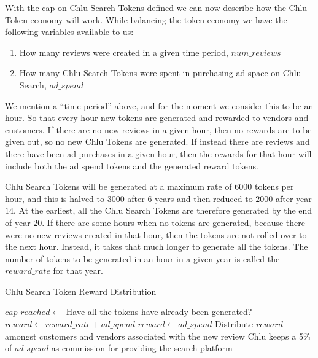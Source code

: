 \documentclass[a4paper]{article}
\begin{document}
With the cap on Chlu Search Tokens defined we can now describe how the
Chlu Token economy will work. While balancing the token economy we
have the following variables available to us:

\begin{enumerate}
\item How many reviews were created in a given time period, $num\_reviews$
\item How many Chlu Search Tokens were spent in purchasing ad space on
  Chlu Search, $ad\_spend$
\end{enumerate}

We mention a ``time period'' above, and for the moment we consider
this to be an hour. So that every hour new tokens are generated and
rewarded to vendors and customers. If there are no new reviews in a
given hour, then no rewards are to be given out, so no new Chlu Tokens
are generated. If instead there are reviews and there have been ad
purchases in a given hour, then the rewards for that hour will include
both the ad spend tokens and the generated reward tokens.

Chlu Search Tokens will be generated at a maximum rate of $6000$
tokens per hour, and this is halved to $3000$ after $6$ years and then
reduced to $2000$ after year $14$. At the earliest, all the Chlu
Search Tokens are therefore generated by the end of year $20$. If
there are some hours when no tokens are generated, because there were
no new reviews created in that hour, then the tokens are not rolled
over to the next hour. Instead, it takes that much longer to generate
all the tokens. The number of tokens to be generated in an hour in a
given year is called the $reward\_rate$ for that year.

\begin{algorithm}
  \caption{Chlu Search Token Reward Distribution}\label{reward-algo}
  \begin{algorithmic}
    \STATE $cap\_reached \leftarrow$ Have all the tokens have already been generated?
    \STATE $reward \leftarrow reward\_rate + ad\_spend$
    \STATE $reward \leftarrow ad\_spend$
    \ENDIF
    \STATE Distribute $reward$ amongst customers and vendors associated with the new review
    \STATE Chlu keeps a 5\% of $ad\_spend$ as  commission for providing the search platform
  \end{algorithmic}    
\end{algorithm}
\end{document}
